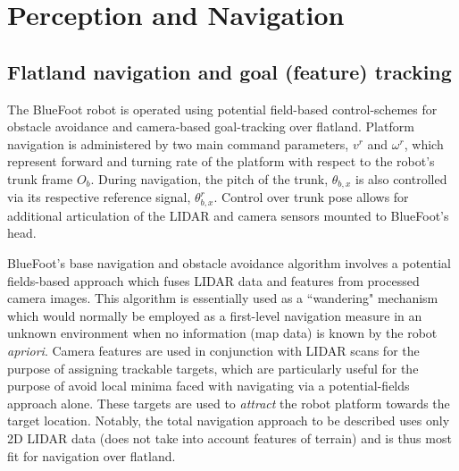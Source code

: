 \chapter{Perception and Navigation}
\label{ch::navigation}


	\section{Flatland navigation and goal (feature) tracking}
	
		The BlueFoot robot is operated using potential field-based control-schemes for obstacle avoidance and camera-based goal-tracking over flatland. Platform navigation is administered by two main command parameters, $v^{r}$ and $\omega^{r}$, which represent forward and turning rate of the platform with respect to the robot's trunk frame $O_{b}$. During navigation, the pitch of the trunk, $\theta_{b,x}$ is also controlled via its respective reference signal, $\theta_{b,x}^{r}$. Control over trunk pose allows for additional articulation of the LIDAR and camera sensors mounted to BlueFoot's head. 

		BlueFoot's base navigation and obstacle avoidance algorithm involves a potential fields-based approach which fuses LIDAR data and features from processed camera images. This algorithm is essentially used as a ``wandering" mechanism which would normally be employed as a first-level navigation measure in an unknown environment when no information (\EG map data) is known by the robot \emph{apriori}. Camera features are used in conjunction with LIDAR scans for the purpose of assigning trackable targets, which are particularly useful for the purpose of avoid local minima faced with navigating via a potential-fields approach alone. These targets are used to \emph{attract} the robot platform towards the target location. Notably, the total navigation approach to be described uses only 2D LIDAR data (does not take into account features of terrain) and is thus most fit for navigation over flatland.

